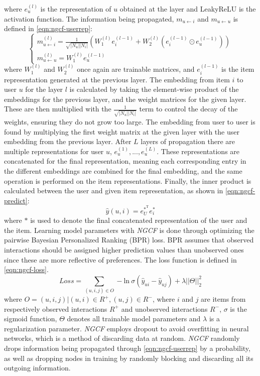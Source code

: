 where $e_u^{(l)}$ is the representation of $u$ obtained at the layer and LeakyReLU is the activation function.
The information being propagated, $m_{u \leftarrow i}$ and $m_{u \leftarrow u}$ is defined in \cref{eqn:ngcf-userrep}:
\begin{equation}\label{eqn:ngcf-userrep}
  \begin{cases}
    m_{u \leftarrow i}^{(l)} = \frac{1}{\sqrt{|N_u||N_i|}} (W_1^{(l)} e_i^{(l-1)} + W_2^{(l)} (e_i^{(l-1)} \odot e_u^{(l-1)}))\\
    m_{u \leftarrow u}^{(l)} = W_1^{(l)}e_u^{(l-1)}
  \end{cases}
\end{equation}
where $W_1^{(l)}$ and $W_2^{(l)}$ once again are trainable matrices, and $e_i^{(l-1)}$ is the item representation generated at the previous layer.
The embedding from item $i$ to user $u$ for the layer $l$ is calculated by taking the element-wise product of the embeddings for the previous layer, and the weight matrices for the given layer.
These are then multiplied with the $\frac{1}{\sqrt{|N_u||N_i|}}$ term to control the decay of the weights, ensuring they do not grow too large.
The embedding from user to user is found by multiplying the first weight matrix at the given layer with the user embedding from the previous layer.
After $L$ layers of propagation there are multiple representations for user $u$, ${e_u^{(1)},...,e_u^{(L)}}$. These representations are concatenated for the final representation, meaning each corresponding entry in the different embeddings are combined for the final embedding, and the same operation is performed on the item representations.
Finally, the inner product is calculated between the user and given item representation, as shown in \cref{eqn:ngcf-predict}:
\begin{equation}\label{eqn:ngcf-predict}
  \hat{y}(u, i) = e_U^{*^\textrm{T}} e_i^*
\end{equation}
where $*$ is used to denote the final concatenated representation of the user and the item.
Learning model parameters with \textit{NGCF} is done through optimizing the pairwise Bayesian Personalized Ranking (BPR) loss.
BPR assumes that observed interactions should be assigned higher prediction values than unobserved ones since these are more reflective of preferences.
The loss function is defined in \cref{eqn:ngcf-loss}.
\begin{equation}\label{eqn:ngcf-loss}
    Loss = \sum_{(u, i, j) \in O} - \textrm{ln} \: \sigma (\hat{y}_{ui} - \hat{y}_{uj}) + \lambda ||\Theta||_2^2
\end{equation}
where $O = {(u, i, j) | (u, i) \in R^+, (u, j) \in R^-}$, where $i$ and $j$ are items from respectively observed interactions $R^+$ and unobserved interactions $R^-$, $\sigma$ is the sigmoid function, $\Theta$ denotes all trainable model parameters and $\lambda$ is a regularization parameter.
\textit{NGCF} employs dropout to avoid overfitting in neural networks, which is a method of discarding data at random.
\textit{NGCF} randomly drops information being propagated through \cref{eqn:ngcf-userrep} by a probability, as well as dropping nodes in training by randomly blocking and discarding all its outgoing information.
